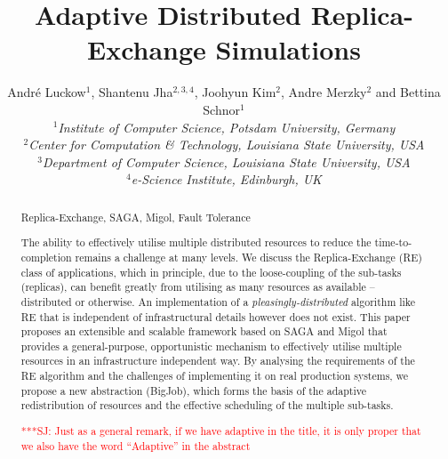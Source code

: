 \documentclass{rspublic}
\title[Adaptive Distributed Replica-Exchange Simulations]{Adaptive Distributed
  Replica-Exchange Simulations}
\author[Luckow, Jha, Kim, Merzky, Schnor]{
  Andr\'e Luckow$^{1}$, Shantenu Jha$^{2,3,4}$, Joohyun Kim$^{2}$, Andre Merzky$^{2}$ and Bettina Schnor$^{1}$\\
  \small{\emph{$^{1}$Institute of Computer Science, Potsdam University, Germany}}\\
  \small{\emph{$^{2}$Center for Computation \& Technology, Louisiana State University, USA}}\\
  \small{\emph{$^{3}$Department of Computer Science, Louisiana State
      University, USA}}\\
  \small{\emph{$^{4}$e-Science Institute, Edinburgh, UK}}\\
}
\newcommand{\jhanote}[1]{ {\textcolor{red} { ***SJ: #1 }}}
\newcommand{\jhanote}[1]{}
\begin{document}
 


\maketitle    

\begin{abstract}{Replica-Exchange, SAGA, Migol, Fault Tolerance}  


  The ability to effectively utilise multiple distributed resources to
  reduce the time-to-completion remains a challenge at many levels.
  We discuss the Replica-Exchange (RE) class of applications, which in
  principle, due to the loose-coupling of the sub-tasks (replicas),
  can benefit greatly from utilising as many resources as available --
  distributed or otherwise.  An implementation of a {\it
    pleasingly-distributed} algorithm like RE that is
  independent of infrastructural details however does not exist.  This
  paper proposes an extensible and scalable framework based on SAGA
  and Migol that provides a general-purpose, opportunistic mechanism
  to effectively utilise multiple resources in an infrastructure
  independent way. By analysing the requirements of the RE algorithm
  and the challenges of implementing it on real production systems, we
  propose a new abstraction (BigJob), which forms the basis of the
  adaptive redistribution of resources and the effective scheduling of
  the multiple sub-tasks.

  \jhanote{Just as a general remark, if we have adaptive in the title,
    it is only proper that we also have the word ``Adaptive'' in the
    abstract}




\end{abstract}
\end{document}
